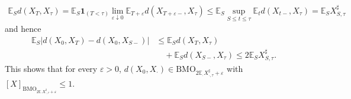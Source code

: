 \documentclass[12pt,oneside,reqno,fleqn]{amsart}
\numberwithin{equation}{section}
\theoremstyle{remark}
\newcommand\mE{{\mathbb E}}
\newcommand\E{\mE}
\newcommand{\1}{{\mathbf 1}}
\renewcommand{\le}{\leq}
\newcommand{\bmo}{{\mathrm{BMO}}}
\begin{document}
	\begin{align*}
	 	\E_Sd(X_T,X_\tau)=\E_S\1_{(T<\tau)}\!\lim_{\varepsilon\downarrow0}\E_{T+\varepsilon}\!d(X_{T+\varepsilon-},X_\tau)
	 	\le \E_S\sup_{S\le t\le \tau}\E_td(X_{t-},X_\tau)=\E_S X^\sharp_{S,\tau}
	\end{align*}
	and hence 
	\begin{align*}
			\E_S|d(X_0,X_T)-d(X_0,X_{S-})|&\le \E_S d(X_T,X_\tau)\\ 
			&\quad+\E_S d(X_{S-},X_\tau)\le 2\E_S X^\sharp_{S,\tau}.
	\end{align*}
	This shows that for every $\varepsilon>0$, $d(X_0,X_\cdot)\in\bmo_{2\E_\cdot X^\sharp_{\cdot, \tau}+\varepsilon}$ with $[X]_{\bmo_{2\E_\cdot X^\sharp_{\cdot, \tau}+\varepsilon}}\le 1$. 
\end{document}
